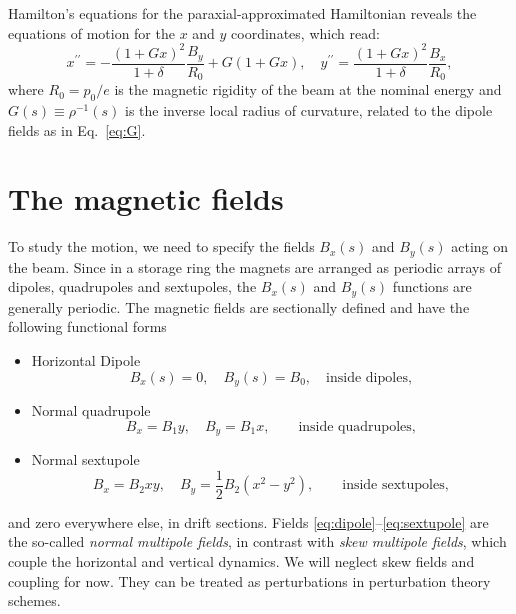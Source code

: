 Hamilton's equations for the paraxial-approximated Hamiltonian reveals the equations of motion for the $x$ and $y$ coordinates, which read:
\begin{equation}
x^{\prime \prime}=-\frac{(1+G x)^{2}}{1+\delta} \frac{B_{y}}{R_0}+G(1+G x),
\quad
y^{\prime \prime}=\frac{(1+G x)^{2}}{1+\delta} \frac{B_{x}}{R_0},
\label{eq:EOMs}
\end{equation}
where $R_0 = p_0/e$ is the magnetic rigidity of the beam at the nominal energy and $G(s)\equiv\rho^{-1}(s)$ is the inverse local radius of curvature, related to the dipole fields as in Eq.~\eqref{eq:G}.

\section{The magnetic fields}
To study the motion, we need to specify the fields $B_x(s)$ and $B_y(s)$ acting on the beam. Since in a storage ring the magnets are arranged as periodic arrays of dipoles, quadrupoles and sextupoles, the $B_x(s)$ and $B_y(s)$ functions are generally periodic. The magnetic fields are sectionally defined and have the following functional forms
\begin{itemize}
    \item Horizontal Dipole
           \begin{equation} B_x(s) = 0, \quad B_y(s) = B_0, \quad \text{inside dipoles},
            \label{eq:dipole}
           \end{equation}
    \item Normal quadrupole
          \begin{equation}B_x = B_1 y, \quad B_y = B_1 x, \quad \quad \text{inside quadrupoles},
            \label{eq:quadrupole}
           \end{equation}
    \item Normal sextupole
          \begin{equation}B_x = B_2xy, \quad B_y = \frac{1}{2}B_2(x^2 - y^2), \quad \quad \text{inside sextupoles},
            \label{eq:sextupole}
           \end{equation}
\end{itemize}
and zero everywhere else, in drift sections. Fields \eqref{eq:dipole}--\eqref{eq:sextupole}  are the so-called \textit{normal multipole fields}, in contrast with \textit{skew multipole fields}, which couple the horizontal and vertical dynamics. We will neglect skew fields and coupling for now. They can be treated as perturbations in perturbation theory schemes.

